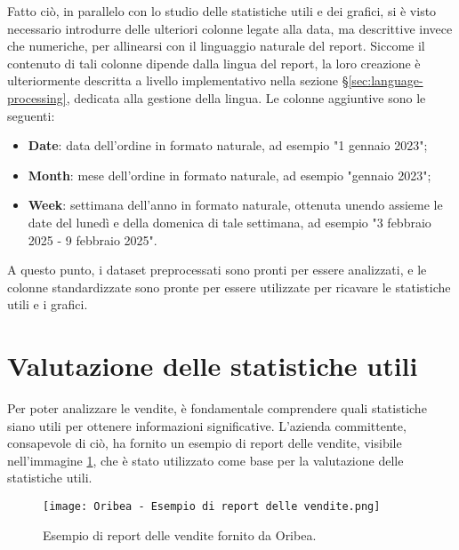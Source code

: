 Fatto ciò, in parallelo con lo studio delle statistiche utili e dei grafici, si è visto necessario introdurre delle ulteriori colonne legate alla data, ma descrittive invece che numeriche, per allinearsi con il linguaggio naturale del report. Siccome il contenuto di tali colonne dipende dalla lingua del report, la loro creazione è ulteriormente descritta a livello implementativo nella sezione \S\ref{sec:language-processing}, dedicata alla gestione della lingua. Le colonne aggiuntive sono le seguenti:
\begin{itemize}
    \item \textbf{Date}: data dell'ordine in formato naturale, ad esempio "1 gennaio 2023";
    \item \textbf{Month}: mese dell'ordine in formato naturale, ad esempio "gennaio 2023";
    \item \textbf{Week}: settimana dell'anno in formato naturale, ottenuta unendo assieme le date del lunedì e della domenica di tale settimana, ad esempio "3 febbraio 2025 - 9 febbraio 2025".
\end{itemize}

A questo punto, i dataset preprocessati sono pronti per essere analizzati, e le colonne standardizzate sono pronte per essere utilizzate per ricavare le statistiche utili e i grafici.



\section{Valutazione delle statistiche utili}

Per poter analizzare le vendite, è fondamentale comprendere quali statistiche siano utili per ottenere informazioni significative. L'azienda committente, consapevole di ciò, ha fornito un esempio di report delle vendite, visibile nell'immagine \ref{fig:oribea-report-example}, che è stato utilizzato come base per la valutazione delle statistiche utili.

\begin{figure}[!h]
    \centering
    \texttt{[image: Oribea - Esempio di report delle vendite.png]}
    \caption{Esempio di report delle vendite fornito da Oribea.}
    \label{fig:oribea-report-example}
\end{figure}

